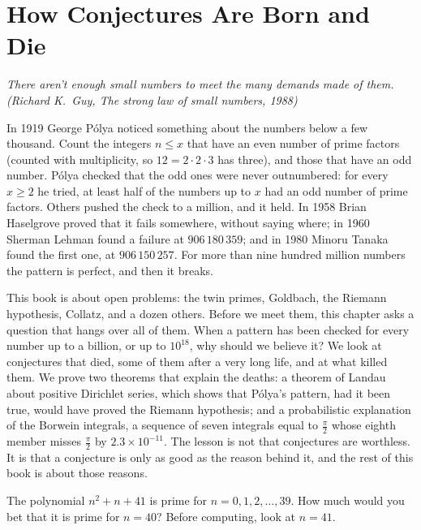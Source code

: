 \chapter{How Conjectures Are Born and Die}\label{ch:born}

\begin{center}\itshape
There aren't enough small numbers to meet the many demands made of them.
\upshape(Richard K.~Guy, \emph{The strong law of small numbers}, 1988)
\end{center}

In 1919 George P\'olya noticed something about the numbers below a few thousand. Count the integers $n\le x$ that have an even number of prime factors
(counted with multiplicity, so $12=2\cdot2\cdot3$ has three), and those that have an odd number. P\'olya checked that the odd ones were never outnumbered: for every
$x\ge2$ he tried, at least half of the numbers up to $x$ had an odd number of prime factors. Others pushed the check to a million, and it held. In 1958 Brian
Haselgrove proved that it fails somewhere, without saying where; in 1960 Sherman Lehman found a failure at $906\,180\,359$; and in 1980 Minoru Tanaka found the
first one, at $906\,150\,257$. For more than nine hundred million numbers the pattern is perfect, and then it breaks.

This book is about open problems: the twin primes, Goldbach, the Riemann hypothesis, Collatz, and a dozen others. Before we meet them, this chapter asks a
question that hangs over all of them. When a pattern has been checked for every number up to a billion, or up to $10^{18}$, why should we believe it? We
look at conjectures that died, some of them after a very long life, and at what killed them. We prove two theorems that explain the deaths: a theorem of
Landau about positive Dirichlet series, which shows that P\'olya's pattern, had it been true, would have proved the Riemann hypothesis; and a probabilistic
explanation of the Borwein integrals, a sequence of seven integrals equal to $\frac\pi2$ whose eighth member misses $\frac\pi2$ by $2.3\times10^{-11}$. The lesson
is not that conjectures are worthless. It is that a conjecture is only as good as the reason behind it, and the rest of this book is about those reasons.

\begin{think}
The polynomial $n^2+n+41$ is prime for $n=0,1,2,\dots,39$. How much would you bet that it is prime for $n=40$? Before computing, look at $n=41$.
\end{think}


